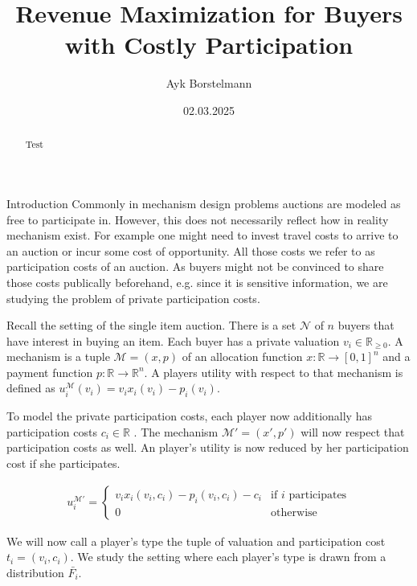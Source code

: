 \documentclass[11pt,a4paper]{article}
\author{Ayk Borstelmann}
\title{Revenue Maximization for Buyers with Costly Participation}
\date{02.03.2025}
\newcommand{\RR}{\ensuremath{\mathbb{R}}}
\newcommand{\1}[1]{\mbox{\rm\bf 1}_{#1}}
\begin{document}
\maketitle

\begin{abstract}
    Test
\end{abstract}

\begin{section}{Introduction}
 Commonly in mechanism design problems auctions are modeled as free to participate in.
 However, this does not necessarily reflect how in reality mechanism exist.
 For example one might need to invest travel costs to arrive to an auction or incur some cost of opportunity.
 All those costs we refer to as participation costs of an auction.
 As buyers might not be convinced to share those costs publically beforehand, e.g. since it is sensitive information, we are studying the problem of private participation costs.

 Recall the setting of the single item auction.
 There is a set $\mathcal{N}$ of $n$ buyers that have interest in buying an item.
 Each buyer has a private valuation $v_i \in \RR_{\geq 0}$.
 A mechanism is a tuple $\mathcal{M} = (x,p)$ of an allocation function $x: \RR \rightarrow [0,1]^n$ and a payment function $p: \RR \rightarrow \RR^n$.
 A players utility with respect to that mechanism is defined as $u_i^\mathcal{M}(v_i) = v_i x_i(v_i) - p_i(v_i)$.

 To model the private participation costs, each player now additionally has participation costs $c_i \in \RR$ \cite{primary}.
 The mechanism $\mathcal{M}' = (x', p')$ will now respect that participation costs as well.
 An player's utility is now reduced by her participation cost if she participates.

 \begin{align*}
     u_i^{\mathcal{M}'} = \begin{cases}
                              v_i x_i(v_i, c_i) - p_i(v_i, c_i) - c_i & \text{if $i$ participates} \\
                              0                                       & \text{otherwise}
                          \end{cases}
 \end{align*}

 We will now call a player's type the tuple of valuation and participation cost $t_i = (v_i, c_i)$.
 We study the setting where each player's type is drawn from a distribution $\bar{F_i}$.
\end{section}
\end{document}
